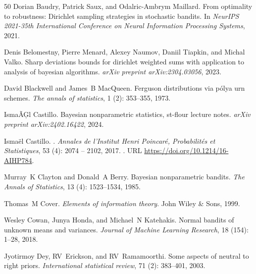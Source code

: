 \documentclass[10pt]{article}
\begin{document}
\begin{thebibliography}{50}
Dorian Baudry, Patrick Saux, and Odalric-Ambrym Maillard.
\newblock From optimality to robustness: Dirichlet sampling strategies in stochastic bandits.
\newblock In \emph{NeurIPS 2021-35th International Conference on Neural Information Processing Systems}, 2021.

Denis Belomestny, Pierre Menard, Alexey Naumov, Daniil Tiapkin, and Michal Valko.
\newblock Sharp deviations bounds for dirichlet weighted sums with application to analysis of bayesian algorithms.
\newblock \emph{arXiv preprint arXiv:2304.03056}, 2023.

David Blackwell and James~B MacQueen.
\newblock Ferguson distributions via p{\'o}lya urn schemes.
\newblock \emph{The annals of statistics}, 1 (2): 353--355, 1973.

Isma{\~A}{\c{G}}l Castillo.
\newblock Bayesian nonparametric statistics, st-flour lecture notes.
\newblock \emph{arXiv preprint arXiv:2402.16422}, 2024.

Isma{\"e}l Castillo.
.
\newblock \emph{Annales de l'Institut Henri Poincaré, Probabilités et Statistiques}, 53 (4): 2074 -- 2102, 2017.
\newblock {}.
\newblock URL \url{https://doi.org/10.1214/16-AIHP784}.

Murray~K Clayton and Donald~A Berry.
\newblock Bayesian nonparametric bandits.
\newblock \emph{The Annals of Statistics}, 13 (4): 1523--1534, 1985.

Thomas~M Cover.
\newblock \emph{Elements of information theory}.
\newblock John Wiley \& Sons, 1999.

Wesley Cowan, Junya Honda, and Michael~N Katehakis.
\newblock Normal bandits of unknown means and variances.
\newblock \emph{Journal of Machine Learning Research}, 18 (154): 1--28, 2018.

Jyotirmoy Dey, RV~Erickson, and RV~Ramamoorthi.
\newblock Some aspects of neutral to right priors.
\newblock \emph{International statistical review}, 71 (2): 383--401, 2003.


\end{thebibliography}
\end{document}
